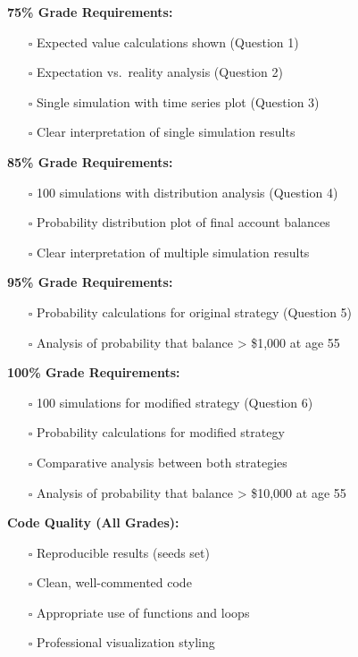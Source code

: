 \documentclass[
  letterpaper,
  DIV=11,
  numbers=noendperiod]{scrartcl}
\providecommand{\tightlist}{%
  \setlength{\itemsep}{0pt}\setlength{\parskip}{0pt}}
\theoremstyle{definition}
\theoremstyle{remark}
\begin{document}
\textbf{75\% Grade Requirements:}

\begin{itemize}
\tightlist
\item[$\square$]
  Expected value calculations shown (Question 1)
\item[$\square$]
  Expectation vs.~reality analysis (Question 2)
\item[$\square$]
  Single simulation with time series plot (Question 3)
\item[$\square$]
  Clear interpretation of single simulation results
\end{itemize}

\textbf{85\% Grade Requirements:}

\begin{itemize}
\tightlist
\item[$\square$]
  100 simulations with distribution analysis (Question 4)
\item[$\square$]
  Probability distribution plot of final account balances
\item[$\square$]
  Clear interpretation of multiple simulation results
\end{itemize}

\textbf{95\% Grade Requirements:}

\begin{itemize}
\tightlist
\item[$\square$]
  Probability calculations for original strategy (Question 5)
\item[$\square$]
  Analysis of probability that balance \textgreater{} \$1,000 at age 55
\end{itemize}

\textbf{100\% Grade Requirements:}

\begin{itemize}
\tightlist
\item[$\square$]
  100 simulations for modified strategy (Question 6)
\item[$\square$]
  Probability calculations for modified strategy
\item[$\square$]
  Comparative analysis between both strategies
\item[$\square$]
  Analysis of probability that balance \textgreater{} \$10,000 at age 55
\end{itemize}

\textbf{Code Quality (All Grades):}

\begin{itemize}
\tightlist
\item[$\square$]
  Reproducible results (seeds set)
\item[$\square$]
  Clean, well-commented code
\item[$\square$]
  Appropriate use of functions and loops
\item[$\square$]
  Professional visualization styling
\end{itemize}
\end{document}
